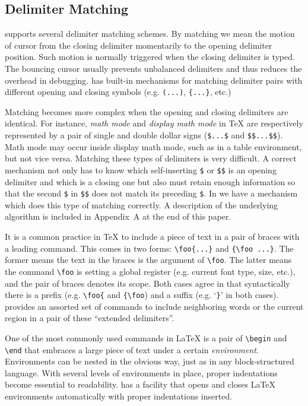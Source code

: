 \subsection{Delimiter Matching}
{\TM} supports several delimiter matching schemes.
By matching we mean the motion of cursor from the closing delimiter momentarily
to the opening delimiter position.
Such motion is normally triggered when the closing delimiter is typed.
The bouncing cursor usually prevents unbalanced delimiters and
thus reduces the overhead in debugging.
{\emacs} has built-in mechanisms for matching delimiter pairs
with different opening and closing symbols (e.g. \verb|(...)|,
\verb|{...}|, etc.) 

Matching becomes more complex when the opening and closing delimiters
are identical.  For instance, {\it math mode\/} and {\it display math mode\/}
in {\TeX} are respectively represented by a pair of single and double
dollar signs (\verb|$...$| and \verb|$$...$$|).
Math mode may occur inside display math mode, such as in a table
environment, but not vice versa.
Matching these types of delimiters is very difficult.
A correct mechanism not only has to know which self-inserting \verb|$|
or \verb|$$| is an opening delimiter and which is a closing one but also
must retain enough information so that the second \verb|$| in \verb|$$|
does not match its preceding \verb|$|.
In {\TM} we have a mechanism which does this type of matching correctly.
A description of the underlying algorithm is included in Appendix~A at the
end of this paper.

It is a common practice in {\TeX} to include a piece of text
in a pair of braces with a leading command.  This comes in two forms:
\verb|\foo{...}| and \verb|{\foo ...}|.  The former means the text in
the braces is the argument of \verb|\foo|.  The latter means the command
\verb|\foo| is setting a global register (e.g. current font type, size, etc.),
and the pair of braces denotes its scope.  Both cases agree in that
syntactically there is a prefix (e.g. \verb|\foo{| and \verb|{\foo|)
and a suffix (e.g. `\verb|}|' in both cases).
{\TM} provides an assorted set of commands
to include neighboring words or the current region in a pair of these
``extended delimiters''.  

One of the most commonly used commands in {\LaTeX} is a pair of \verb|\begin| 
and \verb|\end| that embraces a large piece of text under a 
certain {\it environment\/}.  Environments can be nested in the obvious way,
just as in any block-structured language.
With several levels of environments in place, proper indentations
become essential to readability.
{\TM} has a facility that opens and closes {\LaTeX} environments
automatically with proper indentations inserted.

